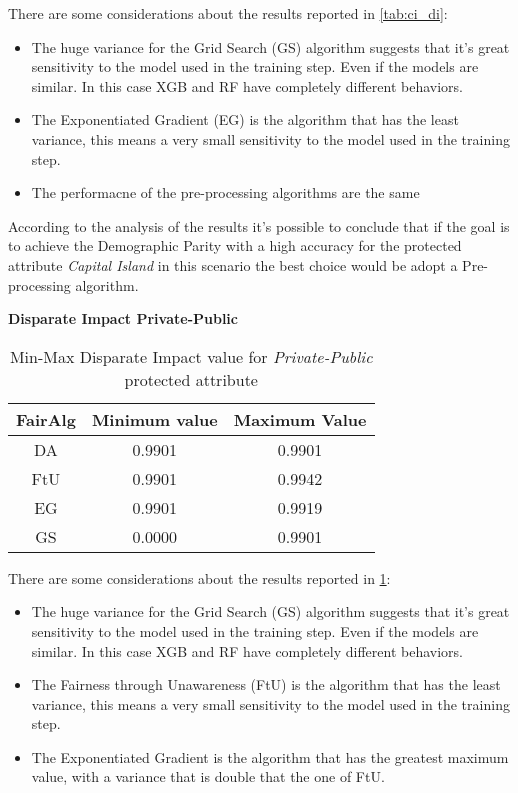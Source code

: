 There are some considerations about the results reported in \cref{tab:ci_di}:

\begin{itemize}

    \item The huge variance for the Grid Search (GS) algorithm suggests that it's great sensitivity to the model used in the training step. Even if the models are similar. In this case XGB and RF have completely different behaviors.

    \item The Exponentiated Gradient (EG) is the algorithm that has the least variance, this means a very small sensitivity to the model used in the training step.

    \item The performacne of the pre-processing algorithms are the same

\end{itemize}

According to the analysis of the results it's possible to conclude that if the goal is to achieve the Demographic Parity with a high accuracy for the protected attribute \emph{Capital Island} in this scenario the best choice would be adopt a Pre-processing algorithm.


\newpage
\textbf{Disparate Impact Private-Public}
\begin{table}
    \centering
    \begin{tabular}{|c|c|c|}
        \hline
        \textbf{FairAlg} & \textbf{Minimum value} & \textbf{Maximum Value} \\
        \hline
        DA & 0.9901 & 0.9901 \\
        \hline
        FtU & 0.9901 & 0.9942 \\
        \hline
        EG & 0.9901 & 0.9919 \\
        \hline
        GS & 0.0000 & 0.9901 \\
        \hline
    \end{tabular}
    \caption{Min-Max Disparate Impact value for \emph{Private-Public} protected attribute}
    \label{tab:pp_di}
\end{table}

There are some considerations about the results reported in \cref{tab:pp_di}:

\begin{itemize}

    \item The huge variance for the Grid Search (GS) algorithm suggests that it's great sensitivity to the model used in the training step. Even if the models are similar. In this case XGB and RF have completely different behaviors.

    \item The Fairness through Unawareness (FtU) is the algorithm that has the least variance, this means a very small sensitivity to the model used in the training step.

    \item The Exponentiated Gradient is the algorithm that has the greatest maximum value, with a variance that is double that the one of FtU.

\end{itemize}

